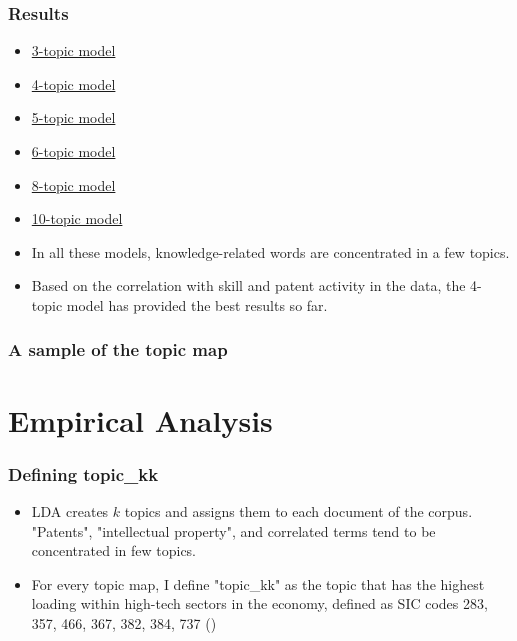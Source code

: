 \documentclass{beamer}
\newcommand{\ffo}{dicfullmc10thr10defnob5noa0_8_4t}
\begin{document}
\begin{frame}
  \frametitle{Results}
  \label{results}
  \begin{itemize}
  \item   \href{https://htmlpreview.github.io/?https://github.com/pbrazval/LDA_10Ks/blob/main/dicfullmc10thr10defnob5noa0_8_3t.html}{3-topic model}
  \item   \href{https://htmlpreview.github.io/?https://github.com/pbrazval/LDA_10Ks/blob/main/dicfullmc10thr10defnob5noa0_8_4t.html}{4-topic model}
  \item   \href{https://htmlpreview.github.io/?https://github.com/pbrazval/LDA_10Ks/blob/main/dicfullmc10thr10defnob5noa0_8_5t.html}{5-topic model}
  \item   \href{https://htmlpreview.github.io/?https://github.com/pbrazval/LDA_10Ks/blob/main/dicfullmc10thr10defnob5noa0_8_6t.html}{6-topic model}
  \item   \href{https://htmlpreview.github.io/?https://github.com/pbrazval/LDA_10Ks/blob/main/dicfullmc10thr10defnob5noa0_8_8t.html}{8-topic model}
  \item   \href{https://htmlpreview.github.io/?https://github.com/pbrazval/LDA_10Ks/blob/main/dicfullmc10thr10defnob5noa0_8_10t.html}{10-topic model}
  \item In all these models, knowledge-related words are concentrated in a few topics. 
  \item Based on the correlation with skill and patent activity in the data, the 4-topic model has provided the best results so far.   \hyperlink{meantiy_details}{}\hyperlink{robthree}{}\hyperlink{robsix}{}
\end{itemize}
\end{frame}


\begin{frame}
  \frametitle{A sample of the topic map}
   \tiny
  
\end{frame}


\section{Empirical Analysis}

\begin{frame}
  \frametitle{Defining topic\_kk}
  \begin{itemize}
  \item LDA creates $k$ topics and assigns them to each document of the corpus. "Patents", "intellectual property", and correlated terms tend to be concentrated in few topics.
  \item For every topic map, I define "topic\_kk" as the topic that has the highest loading within high-tech sectors in the economy, defined as SIC codes 283, 357, 466, 367, 382, 384, 737 (\cite{Brown2009-zp}) 
  
\end{itemize}

\end{frame}
\end{document}
